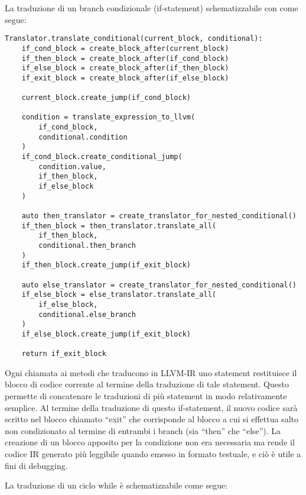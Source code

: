 La traduzione di un branch condizionale (if-statement) schematizzabile con come segue:

\vspace{0.5cm}
\begin{lstlisting}[frame=single]
Translator.translate_conditional(current_block, conditional):
    if_cond_block = create_block_after(current_block)
    if_then_block = create_block_after(if_cond_block)
    if_else_block = create_block_after(if_then_block)
    if_exit_block = create_block_after(if_else_block)

    current_block.create_jump(if_cond_block)

    condition = translate_expression_to_llvm(
        if_cond_block, 
        conditional.condition
    )
    if_cond_block.create_conditional_jump(
        condition.value, 
        if_then_block, 
        if_else_block
    )

    auto then_translator = create_translator_for_nested_conditional()
    if_then_block = then_translator.translate_all(
        if_then_block,
        conditional.then_branch
    )
    if_then_block.create_jump(if_exit_block)

    auto else_translator = create_translator_for_nested_conditional()
    if_else_block = else_translator.translate_all(
        if_else_block,
        conditional.else_branch
    )
    if_else_block.create_jump(if_exit_block)

    return if_exit_block
\end{lstlisting}
\vspace{0.5cm}

Ogni chiamata ai metodi che traducono in LLVM-IR uno statement restituisce il blocco di codice corrente al termine della traduzione
di tale statement. Questo permette di concatenare le traduzioni di più statement in modo relativamente semplice. Al termine della traduzione 
di questo if-statement, il nuovo codice sarà scritto nel blocco chiamato “exit” che corrisponde al blocco a cui si effettua salto non condizionato 
al termine di entrambi i branch (sia “then” che “else”). La creazione di un blocco apposito per la condizione non era necessaria ma 
rende il codice IR generato più leggibile quando emesso in formato testuale, e ciò è utile a fini di debugging. \\

\newpage

La traduzione di un ciclo while è schematizzabile come segue:


